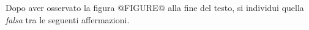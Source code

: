 Dopo aver osservato la figura
@FIGURE@ alla fine del testo, 
si individui quella \emph{falsa} tra le seguenti affermazioni.%